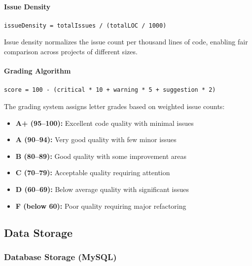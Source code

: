 \documentclass[12pt,a4paper]{article}
\begin{document}
    \paragraph{Issue Density}

    \begin{Verbatim}[frame=single, fontsize=\small]
issueDensity = totalIssues / (totalLOC / 1000)
    \end{Verbatim}

    Issue density normalizes the issue count per thousand lines of code, enabling fair comparison across projects of different sizes.

    \paragraph{Grading Algorithm}

    \begin{Verbatim}[frame=single, fontsize=\small]
score = 100 - (critical * 10 + warning * 5 + suggestion * 2)
    \end{Verbatim}

    The grading system assigns letter grades based on weighted issue counts:

    \begin{itemize}[leftmargin=0.5in]
        \item \textbf{A+ (95--100):} Excellent code quality with minimal issues
        \item \textbf{A (90--94):} Very good quality with few minor issues
        \item \textbf{B (80--89):} Good quality with some improvement areas
        \item \textbf{C (70--79):} Acceptable quality requiring attention
        \item \textbf{D (60--69):} Below average quality with significant issues
        \item \textbf{F (below 60):} Poor quality requiring major refactoring
    \end{itemize}

    \subsection{Data Storage}

    \subsubsection{Database Storage (MySQL)}
\end{document}
